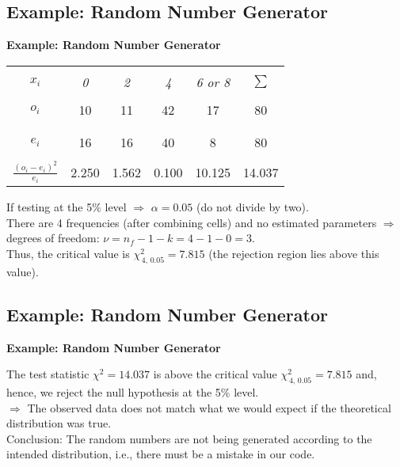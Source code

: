 \documentclass[compress]{beamer}        %
\makeatletter
\newcommand{\tcb}{\textcolor{beamer@blendedblue}}
\makeatother
\begin{document}
\subsection{Example: Random Number Generator}
\begin{frame}{\bf \tcb{Example: Random Number Generator}}\label{rannum}

\begin{center}
\begin{tabular}{|c|cccc|c|}
\hline
&&&&&\\[-0.3cm]
$x_i$      & \emph{0} & \emph{2} & \emph{4} & \emph{6 or 8} & $\sum$ \\[0.1cm]
\hline
&&&&&\\[-0.3cm]
$o_i$ & 10 & 11 & 42 &  17 & 80\\[0.1cm]
&&&&&\\[-0.3cm]
\hline
&&&&&\\[-0.3cm]
$e_i$ & 16 & 16 & 40 & 8 & 80\\[0.1cm]
\hline
&&&&&\\[-0.3cm]
$\frac{(o_i-e_i)^2}{e_i}$ & 2.250 & 1.562 & 0.100 & 10.125  & 14.037
\\[0.1cm]
\hline
\end{tabular}
\end{center}

If testing at the 5\% level $\Rightarrow$ $\alpha = 0.05$ (do not divide by two).\\[0.5cm]

There are 4 frequencies (after combining cells) and no estimated parameters $\Rightarrow$ degrees of freedom: $\nu = n_{f} - 1 - k = 4 - 1 - 0 =3$.\\[0.5cm]

Thus, the critical value is $\chi^2_{\,4,\,0.05} = 7.815$ (the rejection region lies above this value).

\end{frame}



\subsection{Example: Random Number Generator}
\begin{frame}{\bf \tcb{Example: Random Number Generator}}

The test statistic $\chi^2 = 14.037$ is above the critical value $\chi^2_{\,4,\,0.05} = 7.815$ and, hence, we reject the null hypothesis at the 5\% level.\\[1.2cm]

$\Rightarrow$ The observed data does not match what we would expect if the theoretical distribution was true.\\[1.2cm]

Conclusion: The random numbers are not being generated according to the intended distribution, i.e., there must be a mistake in our code.


\end{frame}
\end{document}

